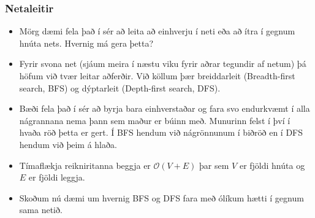 \documentclass{beamer}
\begin{document}
\begin{frame}
\frametitle{Netaleitir}

\begin{itemize}

\item<1-> Mörg dæmi fela það í sér að leita að einhverju í neti eða að ítra í gegnum hnúta nets. Hvernig má gera þetta?

\item<2-> Fyrir svona net (sjáum meira í næstu viku fyrir aðrar tegundir af netum) þá höfum við tvær leitar aðferðir. Við köllum þær breiddarleit (Breadth-first search, BFS) og dýptarleit (Depth-first search, DFS).

\item<3-> Bæði fela það í sér að byrja bara einhverstaðar og fara svo endurkvæmt í alla nágrannana nema þann sem maður er búinn með. Munurinn felst í því í hvaða röð þetta er gert. Í BFS hendum við nágrönnunum í biðröð en í DFS hendum við þeim á hlaða.

\item<4-> Tímaflækja reikniritanna beggja er $\mathcal{O}(V + E)$ þar sem $V$ er fjöldi hnúta og $E$ er fjöldi leggja.

\item<5-> Skoðum nú dæmi um hvernig BFS og DFS fara með ólíkum hætti í gegnum sama netið.

\end{itemize}

\end{frame}
\end{document}
